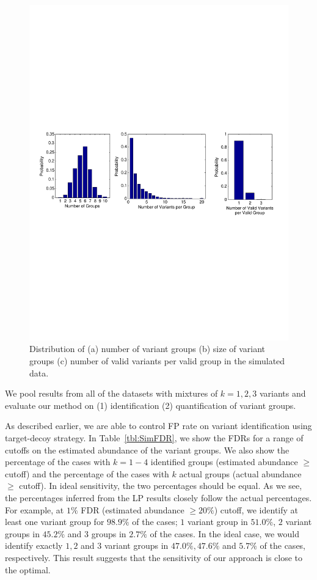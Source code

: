 \begin{figure}[htbp]
\centering %
\includegraphics[trim = 4mm 90mm 4mm 90mm,clip,width=\textwidth]{fig/simulation/Simulation_hist_groups.pdf}
\caption[Variant group statistics for simulated data]{Distribution of (a) number of variant groups (b) size of variant groups (c) number of valid variants per valid group in the simulated data.}
\label{fig:Sim_hist_groups}
\end{figure}

We pool results from all of the datasets with mixtures of $k=1,2,3$ variants and evaluate our method on (1) identification (2) quantification of variant groups.

As described earlier, we are able to control FP rate on variant identification using target-decoy strategy. In Table~\ref{tbl:SimFDR}, we show the FDRs for a range of cutoffs on the estimated abundance of the variant groups. We also show the percentage of the cases with $k=1-4$ identified groups (estimated abundance $\ge$ cutoff) and the percentage of the cases with $k$ actual groups (actual abundance $\ge$ cutoff). In ideal sensitivity, the two percentages should be equal. As we see, the percentages inferred from the LP results closely follow the actual percentages. For example, at $1\%$ FDR (estimated abundance $\ge 20\%$) cutoff, we identify at least one variant group for $98.9\%$ of the cases; $1$ variant group in $51.0\%$, $2$ variant groups in $45.2\%$ and $3$ groups in $2.7\%$ of the cases. In the ideal case, we would identify exactly $1, 2$ and $3$ variant groups in $47.0\%, 47.6\%$ and $5.7\%$ of the cases, respectively. This result suggests that the sensitivity of our approach is close to the optimal.


